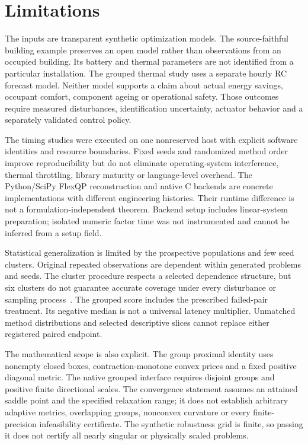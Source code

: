 \section{Limitations}\label{sec:limitations}
The inputs are transparent synthetic optimization models. The source-faithful
building example preserves an open model rather than observations from an
occupied building. Its battery and thermal parameters are not identified
from a particular installation. The grouped thermal study uses a separate
hourly RC forecast model. Neither model supports a claim about actual
energy savings, occupant comfort, component ageing or operational safety.
Those outcomes require measured disturbances, identification uncertainty,
actuator behavior and a separately validated control policy.

The timing studies were executed on one nonreserved host with explicit
software identities and resource boundaries. Fixed seeds and randomized
method order improve reproducibility but do not eliminate operating-system
interference, thermal throttling, library maturity or language-level
overhead. The Python/SciPy FlexQP reconstruction and native C backends
are concrete implementations with different engineering histories. Their
runtime difference is not a formulation-independent theorem. Backend setup
includes linear-system preparation; isolated numeric factor time was not
instrumented and cannot be inferred from a setup field.

Statistical generalization is limited by the prospective populations and
few seed clusters. Original repeated observations are dependent within
generated problems and seeds. The cluster procedure respects a selected
dependence structure, but six clusters do not guarantee accurate coverage
under every disturbance or sampling process~\cite{cameron}. The grouped
score includes the prescribed failed-pair treatment. Its negative median
is not a universal latency multiplier. Unmatched method distributions and
selected descriptive slices cannot replace either registered paired endpoint.

The mathematical scope is also explicit. The group proximal identity uses
nonempty closed boxes, contraction-monotone convex prices and a fixed
positive diagonal metric. The native grouped interface requires disjoint
groups and positive finite directional scales. The convergence statement
assumes an attained saddle point and the specified relaxation range; it
does not establish arbitrary adaptive metrics, overlapping groups,
nonconvex curvature or every finite-precision infeasibility certificate.
The synthetic robustness grid is finite, so passing it does not certify
all nearly singular or physically scaled problems.

